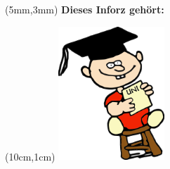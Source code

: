 \thispagestyle{empty}

\begin{textblock*}{10cm}(5mm,3mm)
\normalsize \textbf{Dieses Inforz gehört:}
\end{textblock*}

\begin{textblock*}{4cm}(10cm,1cm)
\includegraphics[width=4cm]{../grafik/wesen/wesen_uni}
\end{textblock*}
